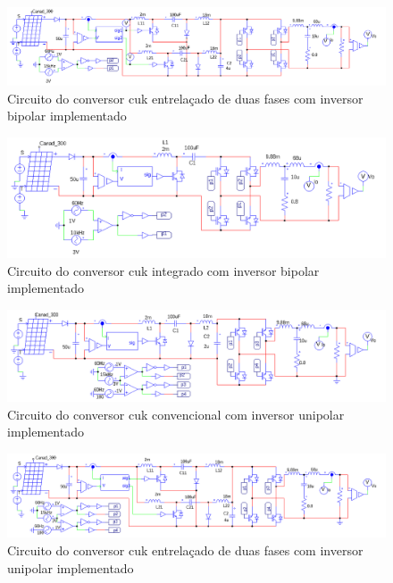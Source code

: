 \documentclass[
	12pt,				%
	openright,			%
	onseside,
	a4paper,			%
	english,			%
	french,				%
	spanish,			%
	brazil,				%
	]{abntex2}
\begin{document}
\begin{anexosenv}
\begin{figure}
\end{figure}

\begin{figure}
	\centering
	\includegraphics[width=\linewidth]{comp_interv_circ_clean}
	\caption{Circuito do conversor cuk entrelaçado de duas fases com inversor bipolar implementado}	
\end{figure}

\begin{figure}
	\centering
	\includegraphics[width=\linewidth]{comp_integ_circ_clean}
	\caption{Circuito do conversor cuk integrado com inversor bipolar implementado}	
\end{figure}


\begin{figure}
	\centering
	\includegraphics[width=\linewidth]{comp_conv_circ_clean_unip}
	\caption{Circuito do conversor cuk convencional com inversor unipolar implementado}	

\end{figure}

\begin{figure}
	\centering
	\includegraphics[width=\linewidth]{comp_interv_circ_clean_unip}
	\caption{Circuito do conversor cuk entrelaçado de duas fases com inversor unipolar implementado}	
\end{figure}


\end{anexosenv}
\end{document}
